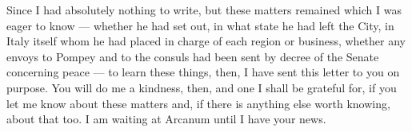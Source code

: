 

 Since I had absolutely nothing to write, but these matters remained which I was eager to know --- whether he had set out, in what state he had left the City, in Italy itself whom he had placed in charge of each region or business, whether any envoys to Pompey and to the consuls had been sent by decree of the Senate concerning peace --- to learn these things, then, I have sent this letter to you on purpose. You will do me a kindness, then, and one I shall be grateful for, if you let me know about these matters and, if there is anything else worth knowing, about that too. I am waiting at Arcanum until I have your news.
